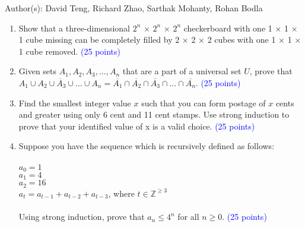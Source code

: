 \documentclass{article}
\newcommand{\pt}[1]{\textcolor{blue}{(#1 points)}}
\begin{document}
Author(s): David Teng, Richard Zhao, Sarthak Mohanty, Rohan Bodla
\newpage
\begin{enumerate}

\item Show that a three-dimensional $2^n$ × $2^n$ × $2^n$ checkerboard with one 1 × 1 × 1 cube missing can be completely filled by 2 × 2 × 2 cubes with one 1 × 1 × 1 cube removed. \pt{25}


\item Given sets $A_1, A_2, A_3, ..., A_n$ that are a part of a universal set $U$, prove  that $\overline{A_1 \cup A_2 \cup A_3 \cup ... \cup A_n} = \overline{A_1} \cap \overline{A_2} \cap \overline{A_3} \cap ... \cap \overline{A_n}$.  \pt{25}


\item Find the smallest integer value $x$ such that you can form postage of $x$ cents and greater using only 6 cent and 11 cent stamps. Use strong induction to prove that your identified value of x is a valid choice. \pt{25}

\item Suppose you have the sequence which is recursively defined as follows:\\
\\$a_0 = 1$
\\$a_1 = 4$
\\$a_2 = 16$
\\$a_t = a_{t-1}+ a_{t-2} + a_{t-3}$, where $t \in \mathbb{Z}^{\geq 3}$\\
\\Using strong induction, prove that $a_n \leq 4^n$ for all $n \geq 0$. \pt{25}



\end{enumerate}
\end{document}
